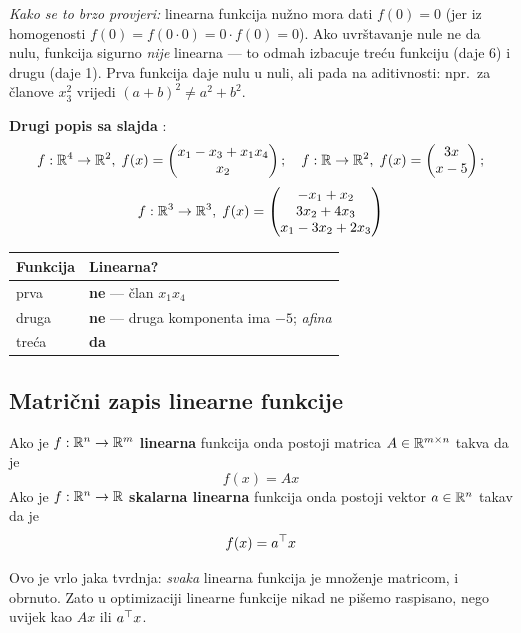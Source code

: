 \emph{Kako se to brzo provjeri:} linearna funkcija nužno mora dati
$f(0) = 0$ (jer iz homogenosti $f(0) = f(0\cdot 0) = 0\cdot f(0) = 0$). Ako
uvrštavanje nule ne da nulu, funkcija sigurno \emph{nije} linearna --- to
odmah izbacuje treću funkciju (daje 6) i drugu (daje 1). Prva funkcija daje
nulu u nuli, ali pada na aditivnosti: npr.\ za članove $x_3^2$ vrijedi
$(a+b)^2 \ne a^2 + b^2$.

\textbf{Drugi popis sa slajda} :
\[
f : \mathbb{R}^4 \to \mathbb{R}^2, \; f(x) = \begin{pmatrix} x_1 - x_3 + x_1x_4 \\ x_2 \end{pmatrix};
\quad
f : \mathbb{R} \to \mathbb{R}^2, \; f(x) = \begin{pmatrix} 3x \\ x - 5 \end{pmatrix};
\]
\[
f : \mathbb{R}^3 \to \mathbb{R}^3, \; f(x) = \begin{pmatrix}
-x_1 + x_2 \\ 3x_2 + 4x_3 \\ x_1 - 3x_2 + 2x_3 \end{pmatrix}
\]

\begin{center}
\begin{tabular}{P{8.6cm}P{4.4cm}}
\toprule
\textbf{Funkcija} & \textbf{Linearna?} \\
\midrule
prva & \textbf{ne} --- član $x_1x_4$ \\
druga & \textbf{ne} --- druga komponenta ima $-5$; \emph{afina} \\
treća & \textbf{da} \\
\bottomrule
\end{tabular}
\end{center}

\subsection{Matrični zapis linearne funkcije}

\begin{teorem}
Ako je $f : \mathbb{R}^n \to \mathbb{R}^m$ \textbf{linearna} funkcija onda postoji matrica
$A \in \mathbb{R}^{m \times n}$ takva da je
\[
f(x) = A x
\]
Ako je $f : \mathbb{R}^n \to \mathbb{R}$ \textbf{skalarna linearna} funkcija onda postoji
vektor $a \in \mathbb{R}^n$ takav da je
\[
f(x) = a^{\top} x
\]
\end{teorem}

Ovo je vrlo jaka tvrdnja: \emph{svaka} linearna funkcija je množenje matricom,
i obrnuto. Zato u optimizaciji linearne funkcije nikad ne pišemo raspisano,
nego uvijek kao $Ax$ ili $a^{\top} x$.

